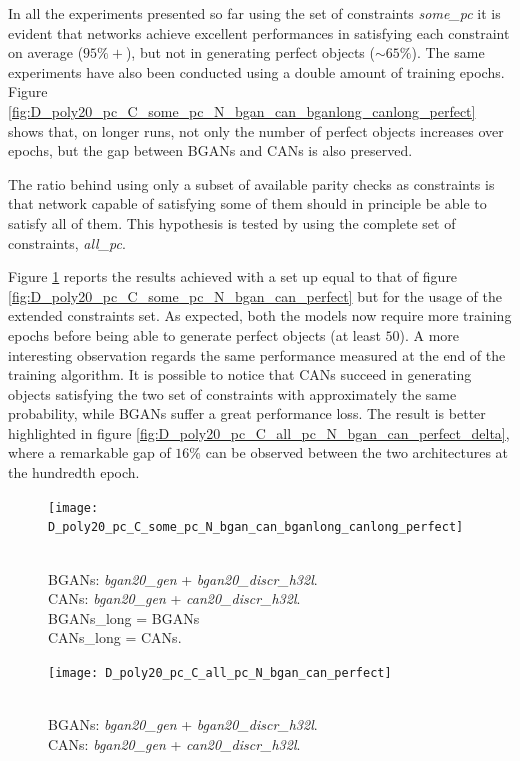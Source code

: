 In all the experiments presented so far using the set of constraints \textit{some\_pc} it is evident that networks achieve excellent performances in satisfying each constraint on average ($95\%+$), but not in generating perfect objects (${\sim}65\%$). The same experiments have also been conducted using a double amount of training epochs. Figure \ref{fig:D_poly20_pc_C_some_pc_N_bgan_can_bganlong_canlong_perfect} shows that, on longer runs, not only the number of perfect objects increases over epochs, but the gap between BGANs and CANs is also preserved.


The ratio behind using only a subset of available parity checks as constraints is that network capable of satisfying some of them should in principle be able to satisfy all of them. This hypothesis is tested by using the complete set of constraints, \textit{all\_pc}.

Figure \ref{fig:D_poly20_pc_C_all_pc_N_bgan_can_perfect} reports the results achieved with a set up equal to that of figure \ref{fig:D_poly20_pc_C_some_pc_N_bgan_can_perfect} but for the usage of the extended constraints set. As expected, both the models now require more training epochs before being able to generate perfect objects (at least $50$). A more interesting observation regards the same performance measured at the end of the training algorithm. It is possible to notice that CANs succeed in generating objects satisfying the two set of constraints with approximately the same probability, while BGANs suffer a great performance loss. The result is better highlighted in figure \ref{fig:D_poly20_pc_C_all_pc_N_bgan_can_perfect_delta}, where a remarkable gap of $16\%$ can be observed between the two architectures at the hundredth epoch.

\begin{figure}[ht]
    \centering
    \begin{minipage}[t]{0.45\textwidth}
        \centering
        \texttt{[image: D\_poly20\_pc\_C\_some\_pc\_N\_bgan\_can\_bganlong\_canlong\_perfect]}
        \caption{\\BGANs: \textit{bgan20\_gen} + \textit{bgan20\_discr\_h32l}.\\
        CANs: \textit{bgan20\_gen} + \textit{can20\_discr\_h32l}.\\
        BGANs\_long = BGANs\\
        CANs\_long = CANs.}
        \label{fig:D_poly20_pc_C_some_pc_N_bgan_can_bganlong_canlong_perfect}
    \end{minipage}
    \hfill
    \begin{minipage}[t]{0.45\textwidth}
        \centering
        \texttt{[image: D\_poly20\_pc\_C\_all\_pc\_N\_bgan\_can\_perfect]}
        \caption{\\BGANs: \textit{bgan20\_gen} + \textit{bgan20\_discr\_h32l}.\\
        CANs: \textit{bgan20\_gen} + \textit{can20\_discr\_h32l}.}
        \label{fig:D_poly20_pc_C_all_pc_N_bgan_can_perfect}
    \end{minipage}
\end{figure}

